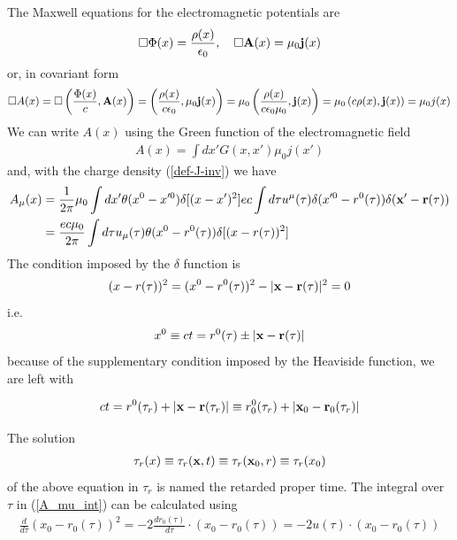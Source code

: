 The Maxwell equations for the electromagnetic potentials are
\begin{align}
    \Box\Phi(x)=\frac{\rho(x)}{\epsilon_0},\quad \Box{\bf A}(x)=\mu_0{\bf j}(x)
\end{align}
or, in covariant form
\begin{align}
    \Box A(x)=\Box\left(\frac{\Phi(x)}c,{\bf A}(x)\right)=\left(\frac{\rho(x)}{c\epsilon_0},\mu_0{\bf j}(x)\right)=\mu_0\left(\frac{\rho(x)}{c\epsilon_0\mu_0},{\bf j}(x)\right)=\mu_0\left(c\rho(x),{\bf j}(x)\right)=\mu_0 j( x)
\end{align}
We can write $A(x)$ using the Green function of the electromagnetic field
\begin{align}
    A(x)=\int dx'G(x,x')\mu_0j(x')
\end{align}
and, with the charge density (\ref{def-J-inv}) we have
\begin{align}
    A_{\mu}(x) & =\frac1{2\pi}\mu_0\int dx' \theta(x^0-x'^0)\delta[(x-x')^2]ec \int d\tau u^{\mu}(\tau)\delta(x'^0-r^0(\tau))\delta({\bf x}'-{\bf r}(\tau))\nonumber \\
               & =\frac{ec\mu_0}{2\pi}\int d\tau u_{\mu}(\tau)\theta(x^0-r^0(\tau))\delta[(x-r(\tau))^2]\label{A_mu_int}
\end{align}
The condition imposed by the $\delta$ function is
\begin{align}
    (x-r(\tau))^2=(x^0-r^0(\tau))^2-|{\bf x}-{\bf r}(\tau)|^2=0\label{def_taur}
\end{align}
i.e.
\begin{align}
    x^0 \equiv ct=r^0(\tau)\pm|{\bf x}-{\bf r}(\tau)|
\end{align}
because of the supplementary condition imposed by the Heaviside function, we are left with
\begin{importantbox}
    \begin{align}
        ct= r^0(\tau_r)+|{\bf x}-{\bf r}(\tau_r)|\equiv r_0^0(\tau_r)+|{\bf x}_0-{\bf r}_0(\tau_r)|\label{deftau_r}
    \end{align}
\end{importantbox}
The solution
\begin{align}
    \tau_r(x)\equiv\tau_r({\bf x},t)\equiv \tau_r({\bf x}_0, r)\equiv \tau_r(x_0)\label{deftaur}
\end{align}
of the above equation in $\tau_r$ is named the retarded proper time.
The integral over $\tau$ in (\ref{A_mu_int}) can be calculated using
\begin{align}
    \frac{d}{d\tau}(x_0-r_0(\tau))^2=-2\frac{dr_0(\tau)}{d\tau}\cdot(x_0-r_0(\tau))=-2u(\tau)\cdot(x_0-r_0(\tau))
\end{align}
